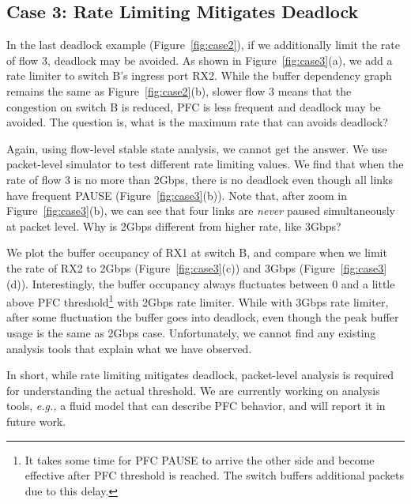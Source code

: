 \secspace
\subsection{Case 3: Rate Limiting Mitigates Deadlock}
\secspace

In the last deadlock example (Figure~\ref{fig:case2}), if we additionally limit the rate of flow 3, deadlock
may be avoided.  As shown in Figure~\ref{fig:case3}(a), we add a rate limiter to switch B's
ingress port RX2. While the buffer dependency graph remains the same as Figure~\ref{fig:case2}(b), 
slower flow 3 means that the congestion on switch B is reduced, PFC is less
frequent and deadlock may be avoided. The question is, what is the maximum rate that can
avoids deadlock?

Again, using flow-level stable state analysis, we cannot get the answer. We use packet-level simulator
to test different rate limiting values. We find that when the rate of flow 3 is no more than 2Gbps,
there is no deadlock even though all links have frequent PAUSE (Figure~\ref{fig:case3}(b)).
Note that, after zoom in Figure~\ref{fig:case3}(b), we can see that four links are {\em never} paused
simultaneously at packet level. Why is 2Gbps different from higher rate, like 3Gbps?

We plot the buffer occupancy of RX1 at switch B, and compare when we limit the rate of RX2 to 2Gbps
(Figure~\ref{fig:case3}(c)) and 3Gbps (Figure~\ref{fig:case3}(d)). Interestingly, the buffer occupancy
always fluctuates between 0 and a little above PFC threshold\footnote{It takes some time for PFC PAUSE 
to arrive the other side and become effective after PFC threshold is reached.
The switch buffers additional packets due to this delay.} with 2Gbps rate limiter. While with 3Gbps rate
limiter, after some fluctuation the buffer goes into deadlock, even though the peak buffer usage is the same 
as 2Gbps case. Unfortunately, we cannot find any existing analysis tools that explain 
what we have observed. 

In short, while rate limiting mitigates deadlock, packet-level analysis is required for understanding
the actual threshold. We are currently working on analysis tools, {\em e.g.,} a fluid model that 
can describe PFC behavior, and will report it in future work.







